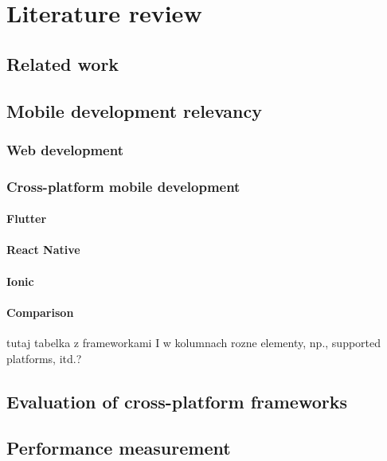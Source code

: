 
\chapter{Literature review}

\section{Related work}

\section{Mobile development relevancy}



\subsection{Web development}

\subsection{Cross-platform mobile development}

\subsubsection{Flutter}
\subsubsection{React Native}
\subsubsection{Ionic}
\subsubsection{Comparison}
tutaj tabelka z frameworkami I w kolumnach rozne elementy, np., supported platforms, itd.?

\section{Evaluation of cross-platform frameworks}

\section{Performance measurement}

